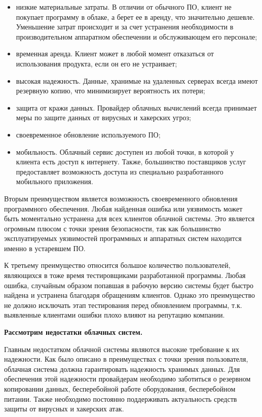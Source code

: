 \begin{itemize}
	\item низкие материальные затраты. В отличии от обычного ПО, клиент не покупает программу в облаке, а берет ее в аренду, что значительно дешевле. Уменьшение затрат происходит и за счет устранения необходимости в производительном аппаратном обеспечении и обслуживающем его персонале;

	\item временная аренда. Клиент может в любой момент отказаться от использования продукта, если он его не устраивает;

	\item высокая надежность. Данные, хранимые на удаленных серверах всегда имеют резервную копию, что минимизирует вероятность их потери;

	\item защита от кражи данных. Провайдер облачных вычислений всегда принимает меры по защите данных от вирусных и хакерских угроз;

	\item своевременное обновление используемого ПО;

	\item мобильность. Облачный сервис доступен из любой точки, в которой у клиента есть доступ к интернету.  Также, большинство поставщиков услуг предоставляет возможность доступа из специально разработанного мобильного приложения.
\end{itemize}

Вторым преимуществом является возможность своевременного обновления программного обеспечения. Любая найденная ошибка или уязвимость может быть моментально устранена для всех клиентов облачной системы. Это является огромным плюсом с точки зрения безопасности, так как большинство эксплуатируемых уязвимостей программных и аппаратных систем находится именно в устаревшем ПО.

К третьему преимущество относится большое количество пользователей, являющихся в тоже время тестировщиками разработанной программы. Любая ошибка, случайным образом попавшая в рабочую версию системы будет быстро найдена и устранена благодаря обращениям клиентов. Однако это преимущество не должно исключать этап тестирования перед обновлением программы, т.к. выявленные клиентами ошибки плохо влияют на репутацию компании.

\textbf{Рассмотрим недостатки облачных систем.}

Главным недостатком облачной системы являются высокие требование к их надежности. Как было описано в преимуществах с точки зрения пользователя, облачная система должна гарантировать надежность хранимых данных. Для обеспечения этой надежности провайдерам необходимо заботиться о резервном копировании данных, бесперебойной работе оборудования, бесперебойном питании. Также необходимо постоянно поддерживать актуальность средств защиты от вирусных и хакерских атак.

